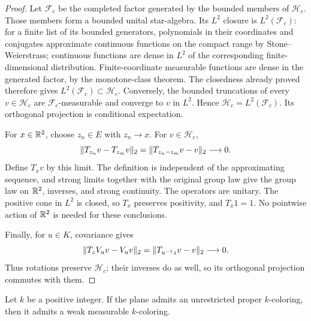 \begin{proof}
Let \(\mathcal F_c\) be the completed factor generated by the bounded
members of \(\mathcal H_c\).  Those members form a bounded unital
star-algebra.  Its \(L^2\) closure is \(L^2(\mathcal F_c)\):
for a finite list of its bounded generators, polynomials in their
coordinates and conjugates approximate continuous functions on the
compact range by Stone--Weierstrass; continuous functions are dense
in \(L^2\) of the corresponding finite-dimensional distribution.
Finite-coordinate measurable functions are dense in the generated
factor, by the monotone-class theorem.  The closedness already proved
therefore gives \(L^2(\mathcal F_c)\subset\mathcal H_c\).
Conversely, the bounded truncations of every \(v\in\mathcal H_c\)
are \(\mathcal F_c\)-measurable and converge to \(v\) in \(L^2\).
Hence \(\mathcal H_c=L^2(\mathcal F_c)\).  Its orthogonal projection
is conditional expectation.

For \(x\in\mathbb R^2\), choose \(z_n\in E\) with \(z_n\to x\).
For \(v\in\mathcal H_c\),
\[
 \lVert T_{z_n}v-T_{z_m}v\rVert_2
   =\lVert T_{z_n-z_m}v-v\rVert_2\longrightarrow0 .
\]
Define \(T_xv\) by this limit.  The definition is independent of the
approximating sequence, and strong limits together with the original
group law give the group law on \(\mathbb R^2\), inverses, and strong
continuity.  The operators are unitary.  The positive cone in \(L^2\)
is closed, so \(T_x\) preserves positivity, and \(T_x1=1\).
No pointwise action of \(\mathbb R^2\) is needed for these conclusions.

Finally, for \(u\in K\), covariance gives
\[
 \lVert T_zV_uv-V_uv\rVert_2
 =\lVert T_{u^{-1}z}v-v\rVert_2\longrightarrow0 .
\]
Thus rotations preserve \(\mathcal H_c\); their inverses do as well,
so its orthogonal projection commutes with them.
\end{proof}

\begin{proposition}
\label{prop:palettes-forward}
Let \(k\) be a positive integer.  If the plane admits an unrestricted
proper \(k\)-coloring, then it admits a weak measurable \(k\)-coloring.
\end{proposition}

